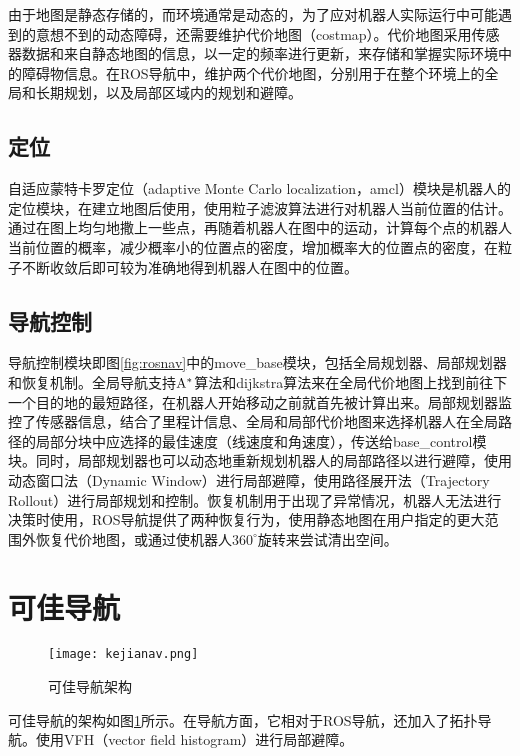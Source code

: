   由于地图是静态存储的，而环境通常是动态的，为了应对机器人实际运行中可能遇到的意想不到的动态障碍，还需要维护代价地图（costmap）。代价地图采用传感器数据和来自静态地图的信息，以一定的频率进行更新，来存储和掌握实际环境中的障碍物信息。在ROS导航中，维护两个代价地图，分别用于在整个环境上的全局和长期规划，以及局部区域内的规划和避障。

\subsection{定位}
  自适应蒙特卡罗定位（adaptive Monte Carlo localization，amcl）模块是机器人的定位模块，在建立地图后使用，使用粒子滤波算法进行对机器人当前位置的估计。通过在图上均匀地撒上一些点，再随着机器人在图中的运动，计算每个点的机器人当前位置的概率，减少概率小的位置点的密度，增加概率大的位置点的密度，在粒子不断收敛后即可较为准确地得到机器人在图中的位置。

\subsection{导航控制}

  导航控制模块即图\ref{fig:rosnav}中的move\_base模块，包括全局规划器、局部规划器和恢复机制。全局导航支持${\rm A}^\ast$算法和dijkstra算法来在全局代价地图上找到前往下一个目的地的最短路径，在机器人开始移动之前就首先被计算出来。局部规划器监控了传感器信息，结合了里程计信息、全局和局部代价地图来选择机器人在全局路径的局部分块中应选择的最佳速度（线速度和角速度），传送给base\_control模块。同时，局部规划器也可以动态地重新规划机器人的局部路径以进行避障，使用动态窗口法（Dynamic Window）\cite{fox1997dynamic}进行局部避障，使用路径展开法（Trajectory Rollout）\cite{gerkey2008planning}进行局部规划和控制。恢复机制用于出现了异常情况，机器人无法进行决策时使用，ROS导航提供了两种恢复行为，使用静态地图在用户指定的更大范围外恢复代价地图，或通过使机器人$360^{\circ}$旋转来尝试清出空间。

\section{可佳导航}

\begin{figure}[htb]
  \centering
  \texttt{[image: kejianav.png]}
  \caption{可佳导航架构}
  \label{fig:kejianav}
\end{figure}

  可佳导航的架构如图\ref{fig:kejianav}所示。在导航方面，它相对于ROS导航，还加入了拓扑导航。使用VFH（vector field histogram）\cite{borenstein1991vector}进行局部避障。